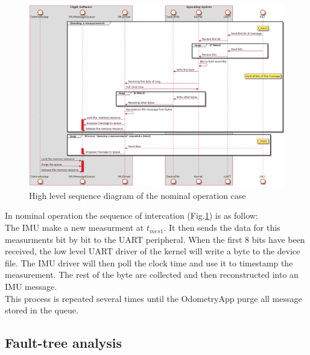 \begin{figure}[H]
    \centering
    \includegraphics[width=1.0 \textwidth]{diagrams/high_level_sys_overview.png}
    \caption{High level sequence diagram of the nominal operation case}
    \label{fig-high-level-nominal}
\end{figure}

In nominal operation the sequence of intercation (Fig.\ref{fig-high-level-nominal}) is as follow:\\
The IMU make a new measurment at $t_{mes1}$.
It then sends the data for this measurments bit by bit to the UART peripheral.
When the first 8 bits have been received, the low level UART driver of the kernel will write a byte to the device file.
The IMU driver will then poll the clock time and use it to timestamp the measurement.
The rest of the byte are collected and then reconstructed into an IMU message.\\

This process is repeated several times until the OdometryApp purge all message stored in the queue.\\

\subsection{Fault-tree analysis}


